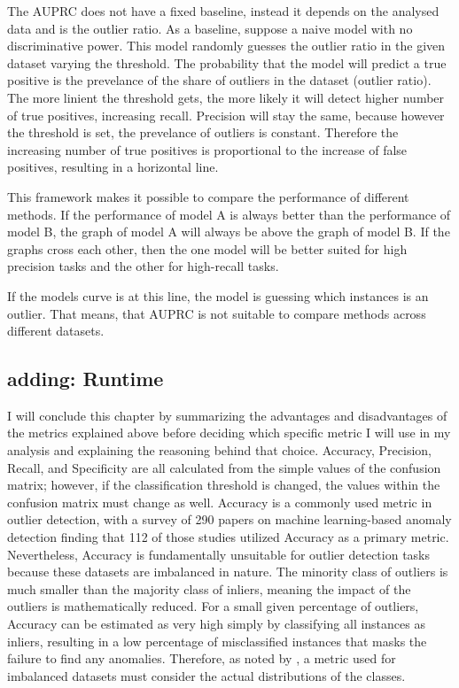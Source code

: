 The AUPRC does not have a fixed baseline, instead it depends on the analysed data and is the outlier ratio.
As a baseline, suppose a naive model with no discriminative power.
This model randomly guesses the outlier ratio in the given dataset varying the threshold.
The probability that the model will predict a true positive is the prevelance of the share of outliers in the dataset (outlier ratio).
The more linient the threshold gets, the more likely it will detect higher number of true positives, increasing recall.
Precision will stay the same, because however the threshold is set, the prevelance of outliers is constant.
Therefore the increasing number of true positives is proportional to the increase of false positives, resulting in a horizontal line.


This framework makes it possible to compare the performance of different methods. 
If the performance of model A is always better than the performance of model B, the graph of model A will always be above the graph of model B.
If the graphs cross each other, then the one model will be better suited for high precision tasks and the other for high-recall tasks.


If the models curve is at this line, the model is guessing which instances is an outlier.
That means, that AUPRC is not suitable to compare methods across different datasets. 


\subsection*{adding: Runtime}


I will conclude this chapter by summarizing the advantages and disadvantages of the metrics explained above before deciding which specific metric I will use in my analysis and explaining the reasoning behind that choice.
Accuracy, Precision, Recall, and Specificity are all calculated from the simple values of the confusion matrix; however, if the classification threshold is changed, the values within the confusion matrix must change as well.
Accuracy is a commonly used metric in outlier detection, with a survey of 290 papers on machine learning-based anomaly detection finding that 112 of those studies utilized Accuracy as a primary metric. \citep[p.78664]{nassif2021}
Nevertheless, Accuracy is fundamentally unsuitable for outlier detection tasks because these datasets are imbalanced in nature. 
The minority class of outliers is much smaller than the majority class of inliers, meaning the impact of the outliers is mathematically reduced. 
For a small given percentage of outliers, Accuracy can be estimated as very high simply by classifying all instances as inliers, resulting in a low percentage of misclassified instances that masks the failure to find any anomalies. 
Therefore, as noted by \citet[p.8]{branco2016survey}, a metric used for imbalanced datasets must consider the actual distributions of the classes.


